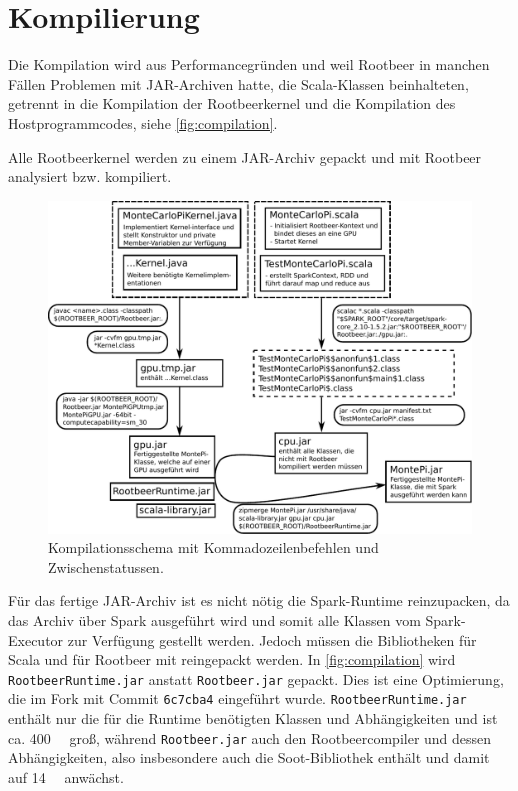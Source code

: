 \section{Kompilierung}
\label{sct:compilation}

Die Kompilation wird aus Performancegründen und weil Rootbeer in manchen Fällen Problemen mit JAR-Archiven hatte, die Scala-Klassen beinhalteten, getrennt in die Kompilation der Rootbeerkernel und die Kompilation des Hostprogrammcodes, siehe \autoref{fig:compilation}.

Alle Rootbeerkernel werden zu einem JAR-Archiv gepackt und mit Rootbeer analysiert bzw. kompiliert.

\begin{figure}[H]
    \centering
    \begin{minipage}{\linewidth}
        \includegraphics[width=\linewidth]{compile-structure-deu-new.pdf}
    \end{minipage}
    \caption{Kompilationsschema mit Kommadozeilenbefehlen und Zwischenstatussen.}
    \label{fig:compilation}
\end{figure}

Für das fertige JAR-Archiv ist es nicht nötig die Spark-Runtime reinzupacken, da das Archiv über Spark ausgeführt wird und somit alle Klassen vom Spark-Executor zur Verfügung gestellt werden.
Jedoch müssen die Bibliotheken für Scala und für Rootbeer mit reingepackt werden.
In \autoref{fig:compilation} wird \lstinline!RootbeerRuntime.jar! anstatt \lstinline!Rootbeer.jar! gepackt.
Dies ist eine Optimierung, die im Fork \cite{ownrootbeerfork} mit Commit \lstinline!6c7cba4! eingeführt wurde.
\lstinline!RootbeerRuntime.jar! enthält nur die für die Runtime benötigten Klassen und Abhängigkeiten und ist ca. \SI{400}{\kilo\byte} groß, während \lstinline!Rootbeer.jar! auch den Rootbeercompiler und dessen Abhängigkeiten, also insbesondere auch die Soot-Bibliothek enthält und damit auf \SI{14}{\mega\byte} anwächst.
